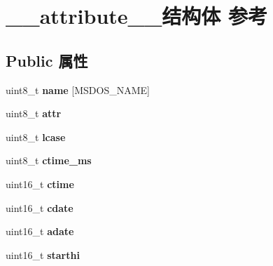 \hypertarget{struct____attribute____}{}\section{\+\_\+\+\_\+attribute\+\_\+\+\_\+结构体 参考}
\label{struct____attribute____}
\subsection*{Public 属性}
\begin{DoxyCompactItemize}
\item 
\mbox{\label{struct____attribute_____a174b3235653121eb20102a38de59318e}} 
uint8\+\_\+t {\bfseries name} \mbox{[}M\+S\+D\+O\+S\+\_\+\+N\+A\+ME\mbox{]}
\item 
\mbox{\label{struct____attribute_____a3ffd87806626cb99302ebfc810e9aed4}} 
uint8\+\_\+t {\bfseries attr}
\item 
\mbox{\label{struct____attribute_____aa12a5aaf4d6dacfbb58ea46ed40e6013}} 
uint8\+\_\+t {\bfseries lcase}
\item 
\mbox{\label{struct____attribute_____a1a3b2175d7dde66a2492d35ed695dc72}} 
uint8\+\_\+t {\bfseries ctime\+\_\+ms}
\item 
\mbox{\label{struct____attribute_____a4f8ff2de5240e90589f85eb737a5ea5c}} 
uint16\+\_\+t {\bfseries ctime}
\item 
\mbox{\label{struct____attribute_____af74bf278f959f5dffe6e0eeb1f9c0051}} 
uint16\+\_\+t {\bfseries cdate}
\item 
\mbox{\label{struct____attribute_____ae14ddf74c16df5dc5e79ce68b2300da8}} 
uint16\+\_\+t {\bfseries adate}
\item 
\mbox{\label{struct____attribute_____a57305c39c2d1529f8a033d2a6f95933f}} 
uint16\+\_\+t {\bfseries starthi}
\item 
\mbox{\label{struct____attribute_____a380cba2a0d0bf561521a8f00a7a15c94}} 

\end{DoxyCompactItemize}
